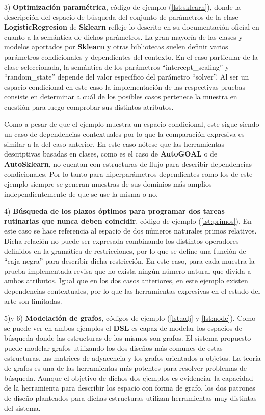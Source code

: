3) {\bf Optimización paramétrica}, código de ejemplo (\ref{lst:sklearn}), donde la descripción del espacio de búsqueda del conjunto de parámetros de la clase
      {\bf LogisticRegresion} de {\bf Sklearn} refleje lo descrito en su documentación oficial en cuanto a la semántica de dichos
parámetros. La gran mayoría de las clases y modelos aportados por {\bf Sklearn} y otras bibliotecas suelen definir varios
parámetros condicionales y dependientes del contexto. En el caso particular de la clase seleccionada, la semántica
de los parámetros ``intercept_scaling'' y ``random_state'' depende del valor específico del parámetro ``solver''. Al ser
un espacio condicional en este caso la implementación de las respectivas pruebas consiste en determinar a cuál de
los posibles casos pertenece la muestra en cuestión para luego comprobar sus distintos atributos.

Como a pesar de que el ejemplo muestra un espacio condicional, este sigue siendo un caso de dependencias contextuales
por lo que la comparación expresiva es similar a la del caso anterior. En este caso nótese que 
las herramientas descriptivas basadas en clases, como es el caso de {\bf AutoGOAL} o de {\bf AutoSklearn}, no cuentan con estructuras
de flujo para describir dependencias condicionales. Por lo tanto para hiperparámetros dependientes como los de este ejemplo siempre se generan
muestras de sus dominios más amplios independientemente de que se use la misma o no.

4) {\bf Búsqueda de los plazos óptimos para programar dos tareas rutinarias que nunca deben coincidir}, código de ejemplo (\ref{lst:primos}). En este caso se hace
referencia al espacio de dos números naturales primos relativos. Dicha relación no puede ser expresada
combinando los distintos operadores definidos en la gramática de restricciones, por lo que se define una función de
``caja negra'' para describir dicha restricción. En este caso, para cada muestra la prueba implementada revisa que no
exista ningún número natural que divida a ambos atributos. Igual que en los dos casos anteriores, en este ejemplo existen
dependencias contextuales, por lo que las herramientas expresivas en el estado del arte son limitadas.

5)y 6) {\bf Modelación de grafos}, códigos de ejemplo (\ref{lst:adj} y \ref{lst:node}). Como se puede ver en ambos ejemplos el {\bf DSL} es capaz de modelar los espacios de búsqueda donde
las estructuras de los mismos son grafos. El sistema propuesto puede modelar grafos utilizando los dos diseños más comunes de
estas estructuras, las matrices de adyacencia y los grafos orientados a objetos. La teoría de grafos es una de las
herramientas más potentes para resolver problemas de búsqueda. Aunque el objetivo de dichos dos ejemplos es evidenciar 
la capacidad de la herramienta para describir los espacio con forma de grafo, 
los dos patrones de diseño planteados para dichas estructuras utilizan herramientas muy distintas del sistema.

